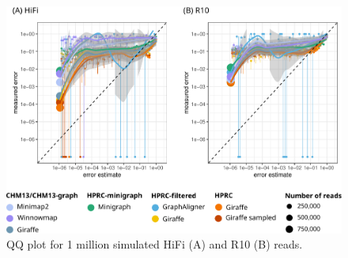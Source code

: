 \documentclass[11pt]{ucscthesis}
\begin{document}
\begin{figure}[htb]
    \centering
    \includegraphics[width=\linewidth]{lr_qq_plots.pdf}
    \caption[HiFi and R10 QQ plot]{QQ plot for 1 million simulated HiFi (A) and R10 (B) reads.}
    \label{fig:qq_hifi_r10}
\end{figure}





\def\baselinestretch{1.0}\large\normalsize

%


\end{document}
